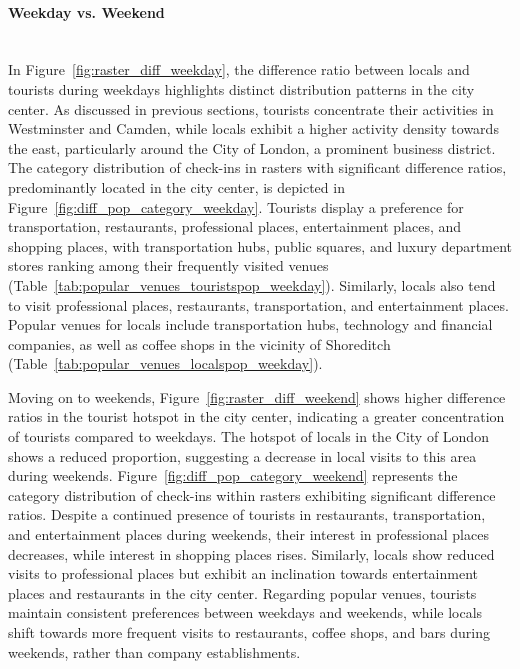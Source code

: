 \documentclass{article}
\newcommand{\subsubsubsection}[1]{\paragraph{#1}\mbox{}\\}
\theoremstyle{definition}
\theoremstyle{remark}
\begin{document}
\subsubsubsection{Weekday vs. Weekend}
In Figure~\ref{fig:raster_diff_weekday}, the difference ratio between locals and tourists during weekdays highlights distinct distribution patterns in the city center. As discussed in previous sections, tourists concentrate their activities in Westminster and Camden, while locals exhibit a higher activity density towards the east, particularly around the City of London, a prominent business district. The category distribution of check-ins in rasters with significant difference ratios, predominantly located in the city center, is depicted in Figure~\ref{fig:diff_pop_category_weekday}. Tourists display a preference for transportation, restaurants, professional places, entertainment places, and shopping places, with transportation hubs, public squares, and luxury department stores ranking among their frequently visited venues (Table~\ref{tab:popular_venues_touristspop_weekday}). Similarly, locals also tend to visit professional places, restaurants, transportation, and entertainment places. Popular venues for locals include transportation hubs, technology and financial companies, as well as coffee shops in the vicinity of Shoreditch (Table~\ref{tab:popular_venues_localspop_weekday}).


Moving on to weekends, Figure~\ref{fig:raster_diff_weekend} shows higher difference ratios in the tourist hotspot in the city center, indicating a greater concentration of tourists compared to weekdays. The hotspot of locals in the City of London shows a reduced proportion, suggesting a decrease in local visits to this area during weekends. Figure~\ref{fig:diff_pop_category_weekend} represents the category distribution of check-ins within rasters exhibiting significant difference ratios. Despite a continued presence of tourists in restaurants, transportation, and entertainment places during weekends, their interest in professional places decreases, while interest in shopping places rises. Similarly, locals show reduced visits to professional places but exhibit an inclination towards entertainment places and restaurants in the city center. Regarding popular venues, tourists maintain consistent preferences between weekdays and weekends, while locals shift towards more frequent visits to restaurants, coffee shops, and bars during weekends, rather than company establishments.
\end{document}
